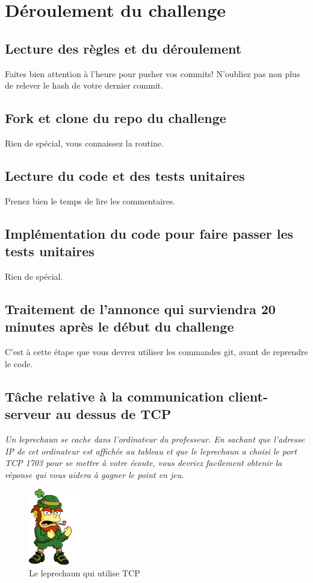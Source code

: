 \documentclass[a4paper, french, 10pt]{article} %
\begin{document}
\section{Déroulement du challenge}

\subsection{Lecture des règles et du déroulement}
Faites bien attention à l'heure pour pusher vos commits! N'oubliez pas non plus de relever le hash de votre dernier commit.
\subsection{Fork et clone du repo du challenge}
Rien de spécial, vous connaissez la routine.
\subsection{Lecture du code et des tests unitaires}
Prenez bien le temps de lire les commentaires.
\subsection{Implémentation du code pour faire passer les tests unitaires}
Rien de spécial.
\subsection{Traitement de l'annonce qui surviendra 20 minutes après le début du challenge}
C'est à cette étape que vous devrez utiliser les commandes git, avant de reprendre le code.
\subsection{Tâche relative à la communication client-serveur au dessus de TCP}
\emph{Un leprechaun se cache dans l'ordinateur du professeur. En sachant que l'adresse IP de cet ordinateur est affichée au tableau et que le leprechaun a choisi le port TCP 1703 pour se mettre à votre écoute, vous devriez facilement obtenir la réponse qui vous aidera à gagner le point en jeu.}
\begin{figure}[h]
\centering
\includegraphics[width=0.2\textwidth]{leprechaun}
\caption{Le leprechaun qui utilise TCP}
\end{figure}
\end{document}
